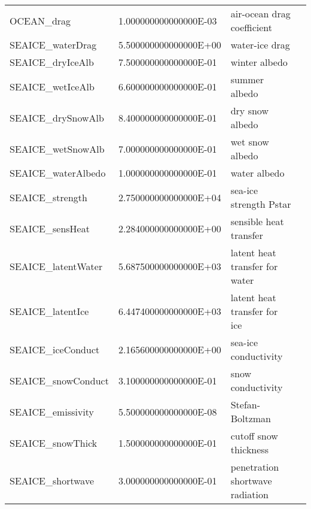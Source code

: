 \begin{table}
\begin{tabular}{lllc}
    \\
   OCEAN\_drag          &                   1.000000000000000E-03
    &   air-ocean drag coefficient 
    &  %
    \\
   SEAICE\_waterDrag    &                   5.500000000000000E+00
    &   water-ice drag 
    &  %
    \\
   SEAICE\_dryIceAlb    &                   7.500000000000000E-01
    &   winter albedo 
    &  %
    \\
   SEAICE\_wetIceAlb    &                   6.600000000000000E-01
    &   summer albedo 
    &  %
    \\
   SEAICE\_drySnowAlb   &                   8.400000000000000E-01
    &   dry snow albedo 
    &  %
    \\
   SEAICE\_wetSnowAlb   &                   7.000000000000000E-01
    &   wet snow albedo 
    &  %
    \\
   SEAICE\_waterAlbedo  &                   1.000000000000000E-01
    &   water albedo 
    &  %
    \\
   SEAICE\_strength     &                   2.750000000000000E+04
    &   sea-ice strength Pstar 
    &  %
    \\
   SEAICE\_sensHeat     &                   2.284000000000000E+00
    &   sensible heat transfer 
    &  %
    \\
   SEAICE\_latentWater  &                   5.687500000000000E+03
    &   latent heat transfer for water 
    &  %
    \\
   SEAICE\_latentIce    &                   6.447400000000000E+03
    &   latent heat transfer for ice 
    &  %
    \\
   SEAICE\_iceConduct   &                   2.165600000000000E+00
    &   sea-ice conductivity 
    &  %
    \\
   SEAICE\_snowConduct  &                   3.100000000000000E-01
    &   snow conductivity 
    &  %
    \\
   SEAICE\_emissivity   &                   5.500000000000000E-08
    &   Stefan-Boltzman 
    &  %
    \\
   SEAICE\_snowThick    &                   1.500000000000000E-01
    &   cutoff snow thickness 
    &  %
    \\
   SEAICE\_shortwave    &                   3.000000000000000E-01
    &   penetration shortwave radiation 
    &  %
    \\

\end{tabular}
\end{table}
